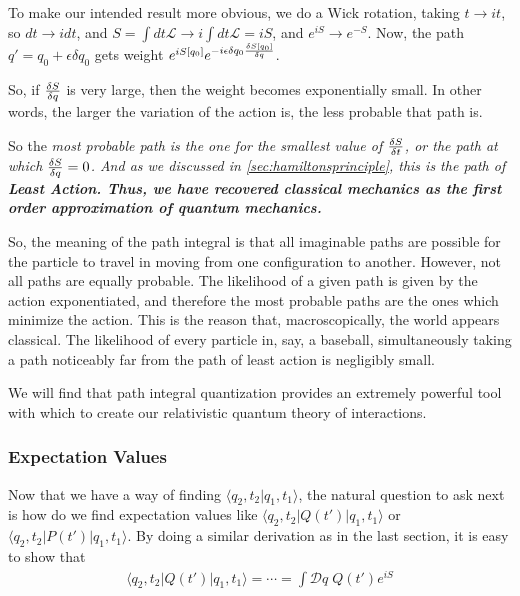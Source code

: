 \documentclass[12pt,epsf]{article}
\def\nolabel{\nonumber }
\def\nolabel{\nonumber }
\begin{document}
To make our intended result more obvious, we do a Wick rotation, taking
$t \rightarrow it$, so $dt \rightarrow idt$, and $S = \int dt
\mathcal{L} \rightarrow i\int dt \mathcal{L} = iS$, and $e^{iS}
\rightarrow e^{-S}$.  Now, the path $q' = q_0 + \epsilon \delta q_0$
gets weight $e^{iS[q_0]}e^{-i \epsilon \delta q_0 {\delta S[q_0] \over
\delta q}}$.  

So, if ${\delta S \over \delta q}$ is very large, then the weight
becomes exponentially small.  In other words, the larger the variation
of the action is, the less probable that path is.  

So the \it most \rm probable path is the one for the \it smallest \rm
value of ${\delta S \over \delta t}$, or the path at which ${\delta S
\over \delta q} = 0$.  And as we discussed in
\ref{sec:hamiltonsprinciple}, this is the path of \bf Least Action\rm. 
Thus, we have recovered classical mechanics as the first order
approximation of quantum mechanics.  

So, the meaning of the path integral is that all imaginable paths are
possible for the particle to travel in moving from one configuration to
another.  However, not all paths are equally probable.	The likelihood
of a given path is given by the action exponentiated, and therefore the
most probable paths are the ones which minimize the action.  This is
the reason that, macroscopically, the world appears classical.	The
likelihood of every particle in, say, a baseball, simultaneously taking
a path noticeably far from the path of least action is negligibly
small.	

We will find that path integral quantization provides an extremely
powerful tool with which to create our relativistic quantum theory of
interactions.  

\subsubsection{Expectation Values}
\label{sec:expectationvalues}

Now that we have a way of finding $\langle q_2,t_2|q_1,t_1\rangle$, the
natural question to ask next is how do we find expectation values like
$\langle q_2,t_2|Q(t')|q_1,t_1\rangle$ or $\langle
q_2,t_2|P(t')|q_1,t_1\rangle$.	By doing a similar derivation as in the
last section, it is easy to show that 
\begin{eqnarray}
\langle q_2,t_2|Q(t')|q_1,t_1\rangle = \cdots = \int \mathcal{D}q\;
Q(t') e^{iS}\nolabel
\end{eqnarray}
\end{document}
